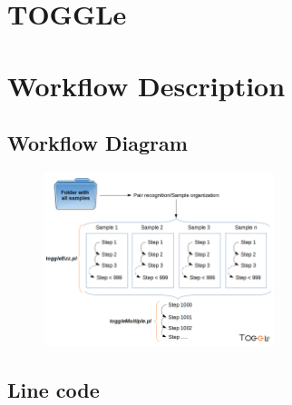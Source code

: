 \documentclass[a4paper]{article}
\begin{document}





\tableofcontents
\newpage



\section{TOGGLe}




\section{Workflow Description}

\subsection{Workflow Diagram}

\begin{figure}[ht]
\centering
\includegraphics[width=0.6\textwidth]{togglePipeline.png}
\end{figure}

\subsection{Line code}

\begin{minipage}{\linewidth}

\end{minipage}
\end{document}
